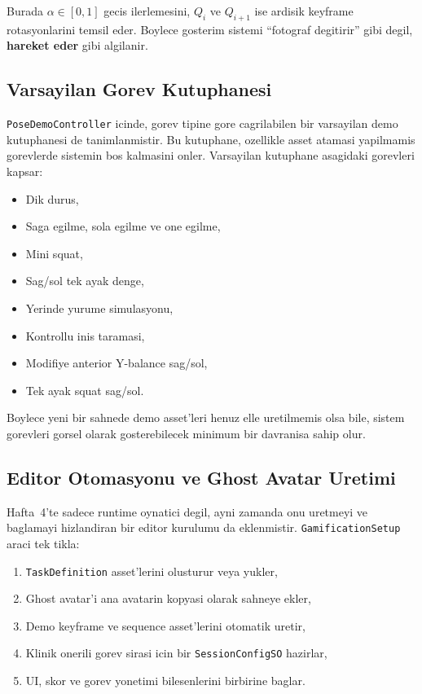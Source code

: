 \documentclass[11pt,a4paper]{article}
\begin{document}
Burada $\alpha \in [0,1]$ gecis ilerlemesini, $Q_i$ ve $Q_{i+1}$ ise ardisik
keyframe rotasyonlarini temsil eder. Boylece gosterim sistemi ``fotograf
degitirir'' gibi degil, \textbf{hareket eder} gibi algilanir.

\subsection{Varsayilan Gorev Kutuphanesi}

\texttt{PoseDemoController} icinde, gorev tipine gore cagrilabilen bir
varsayilan demo kutuphanesi de tanimlanmistir. Bu kutuphane, ozellikle
asset atamasi yapilmamis gorevlerde sistemin bos kalmasini onler.
Varsayilan kutuphane asagidaki gorevleri kapsar:

\begin{itemize}[nosep]
    \item Dik durus,
    \item Saga egilme, sola egilme ve one egilme,
    \item Mini squat,
    \item Sag/sol tek ayak denge,
    \item Yerinde yurume simulasyonu,
    \item Kontrollu inis taramasi,
    \item Modifiye anterior Y-balance sag/sol,
    \item Tek ayak squat sag/sol.
\end{itemize}

Boylece yeni bir sahnede demo asset'leri henuz elle uretilmemis olsa bile,
sistem gorevleri gorsel olarak gosterebilecek minimum bir davranisa sahip
olur.

\subsection{Editor Otomasyonu ve Ghost Avatar Uretimi}

Hafta~4'te sadece runtime oynatici degil, ayni zamanda onu uretmeyi ve
baglamayi hizlandiran bir editor kurulumu da eklenmistir.
\texttt{GamificationSetup} araci tek tikla:

\begin{enumerate}[nosep]
    \item \texttt{TaskDefinition} asset'lerini olusturur veya yukler,
    \item Ghost avatar'i ana avatarin kopyasi olarak sahneye ekler,
    \item Demo keyframe ve sequence asset'lerini otomatik uretir,
    \item Klinik onerili gorev sirasi icin bir \texttt{SessionConfigSO} hazirlar,
    \item UI, skor ve gorev yonetimi bilesenlerini birbirine baglar.
\end{enumerate}
\end{document}
